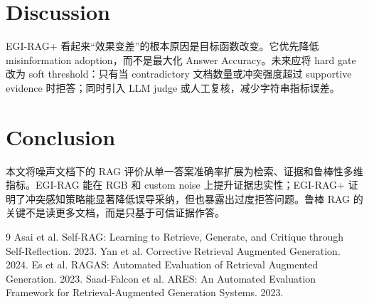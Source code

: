 \documentclass[10pt,twocolumn]{article}
\newcommand{\zh}[1]{{\zhfont #1}}
\begin{document}
\section{Discussion}
\zh{EGI-RAG+ 看起来“效果变差”的根本原因是目标函数改变。它优先降低 misinformation adoption，而不是最大化 Answer Accuracy。未来应将 hard gate 改为 soft threshold：只有当 contradictory 文档数量或冲突强度超过 supportive evidence 时拒答；同时引入 LLM judge 或人工复核，减少字符串指标误差。}

\section{Conclusion}
\zh{本文将噪声文档下的 RAG 评价从单一答案准确率扩展为检索、证据和鲁棒性多维指标。EGI-RAG 能在 RGB 和 custom noise 上提升证据忠实性；EGI-RAG+ 证明了冲突感知策略能显著降低误导采纳，但也暴露出过度拒答问题。鲁棒 RAG 的关键不是读更多文档，而是只基于可信证据作答。}

\begin{thebibliography}{9}
 Asai et al. Self-RAG: Learning to Retrieve, Generate, and Critique through Self-Reflection. 2023.
 Yan et al. Corrective Retrieval Augmented Generation. 2024.
 Es et al. RAGAS: Automated Evaluation of Retrieval Augmented Generation. 2023.
 Saad-Falcon et al. ARES: An Automated Evaluation Framework for Retrieval-Augmented Generation Systems. 2023.
\end{thebibliography}
\end{document}
